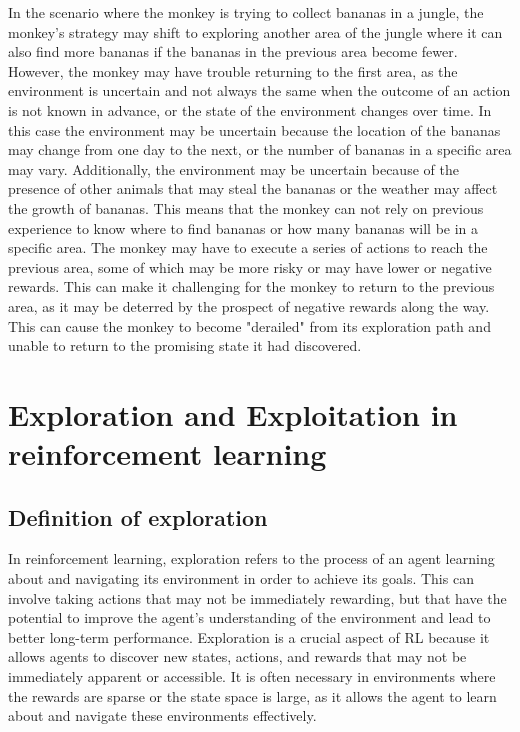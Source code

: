 \documentclass[runningheads]{llncs}%
\begin{document}
In the scenario where the monkey is trying to collect bananas in a jungle, the monkey's strategy may shift to exploring another area of the jungle where it can also find more bananas if the bananas in the previous area become fewer. However, the monkey may have trouble returning to the first area, as the environment is uncertain and not always the same when the outcome of an action is not known in advance, or the state of the environment changes over time. In this case the environment may be uncertain because the location of the bananas may change from one day to the next, or the number of bananas in a specific area may vary. Additionally, the environment may be uncertain because of the presence of other animals that may steal the bananas or the weather may affect the growth of bananas. This means that the monkey can not rely on previous experience to know where to find bananas or how many bananas will be in a specific area. The monkey may have to execute a series of actions to reach the previous area, some of which may be more risky or may have lower or negative rewards. This can make it challenging for the monkey to return to the previous area, as it may be deterred by the prospect of negative rewards along the way. This can cause the monkey to become "derailed" from its exploration path and unable to return to the promising state it had discovered.





\section{Exploration and Exploitation in reinforcement learning}

\subsection{Definition of exploration}
In reinforcement learning, exploration refers to the process of an agent learning about and navigating its environment in order to achieve its goals. This can involve taking actions that may not be immediately rewarding, but that have the potential to improve the agent's understanding of the environment and lead to better long-term performance. Exploration is a crucial aspect of RL because it allows agents to discover new states, actions, and rewards that may not be immediately apparent or accessible. It is often necessary in environments where the rewards are sparse or the state space is large, as it allows the agent to learn about and navigate these environments effectively.\\
\end{document}
